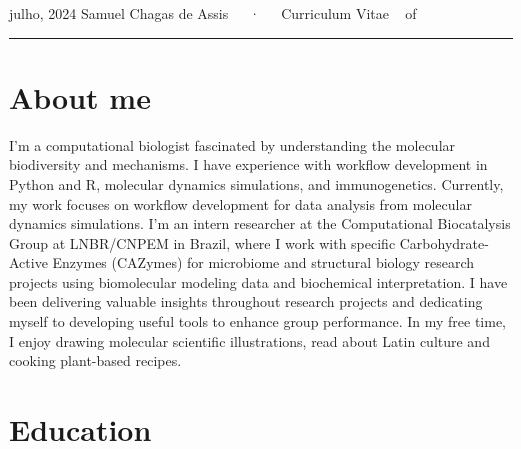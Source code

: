 \documentclass[11pt,a4paper,]{awesome-cv}
\begin{document}
\makecvheader

\makecvfooter
  {julho, 2024}
    {Samuel Chagas de Assis~~~·~~~Curriculum Vitae}
  {\thepage~ of \pageref{LastPage}~}





\begin{center}\rule{0.5\linewidth}{0.5pt}\end{center}

\hypertarget{about-me}{%
\section{About me}\label{about-me}}

\newcommand\tab[1][1cm]{\hspace*{#1}}
\begingroup
\fontsize{10}{12}\selectfont

\hspace*{1cm}I'm a computational biologist fascinated by understanding
the molecular biodiversity and mechanisms. I have experience with
workflow development in Python and R, molecular dynamics simulations,
and immunogenetics. Currently, my work focuses on workflow development
for data analysis from molecular dynamics simulations. I'm an intern
researcher at the Computational Biocatalysis Group at LNBR/CNPEM in
Brazil, where I work with specific Carbohydrate-Active Enzymes (CAZymes)
for microbiome and structural biology research projects using
biomolecular modeling data and biochemical interpretation. I have been
delivering valuable insights throughout research projects and dedicating
myself to developing useful tools to enhance group performance. In my
free time, I enjoy drawing molecular scientific illustrations, read
about Latin culture and cooking plant-based recipes.

\endgroup

\hypertarget{education}{%
\section{Education}\label{education}}
\end{document}
